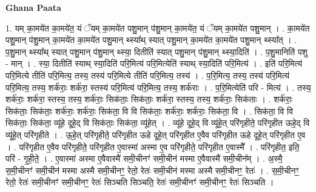 \documentclass[17pt]{extarticle}
\begin{document}
\textbf{Ghana Paata } \newline

1. यम् का॒मये॑त का॒मये॑त॒ यं ॅयम् का॒मये॑त पशु॒मान् प॑शु॒मान् का॒मये॑त॒ यं ॅयम् का॒मये॑त पशु॒मान् । . का॒मये॑त पशु॒मान् प॑शु॒मान् का॒मये॑त का॒मये॑त पशु॒मान् थ्स्या᳚थ् स्यात् पशु॒मान् का॒मये॑त का॒मये॑त पशु॒मान् थ्स्या᳚त् । . प॒शु॒मान् थ्स्या᳚थ् स्यात् पशु॒मान् प॑शु॒मान् थ्स्या॒ दितीति॑ स्यात् पशु॒मान् प॑शु॒मान् थ्स्या॒दिति॑ । . प॒शु॒मानिति॑ पशु - मान् । . स्या॒ दितीति॑ स्याथ् स्या॒दिति॑ परि॒मित्य॑ परि॒मित्येति॑ स्याथ् स्या॒दिति॑ परि॒मित्य॑ । . इति॑ परि॒मित्य॑ परि॒मित्ये तीति॑ परि॒मित्य॒ तस्य॒ तस्य॑ परि॒मित्ये तीति॑ परि॒मित्य॒ तस्य॑ । . प॒रि॒मित्य॒ तस्य॒ तस्य॑ परि॒मित्य॑ परि॒मित्य॒ तस्य॒ शर्क॑राः॒ शर्क॑रा॒ स्तस्य॑ परि॒मित्य॑ परि॒मित्य॒ तस्य॒ शर्क॑राः । . प॒रि॒मित्येति॑ परि - मित्य॑ । . तस्य॒ शर्क॑राः॒ शर्क॑रा॒ स्तस्य॒ तस्य॒ शर्क॑राः॒ सिक॑ताः॒ सिक॑ताः॒ शर्क॑रा॒ स्तस्य॒ तस्य॒ शर्क॑राः॒ सिक॑ताः । . शर्क॑राः॒ सिक॑ताः॒ सिक॑ताः॒ शर्क॑राः॒ शर्क॑राः॒ सिक॑ता॒ वि वि सिक॑ताः॒ शर्क॑राः॒ शर्क॑राः॒ सिक॑ता॒ वि । . सिक॑ता॒ वि वि सिक॑ताः॒ सिक॑ता॒ व्यू॑हे दूहे॒द् वि सिक॑ताः॒ सिक॑ता॒ व्यू॑हेत् । . व्यू॑हे दूहे॒द् वि व्यू॑हे॒त् परि॑गृहीते॒ परि॑गृहीत ऊहे॒द् वि व्यू॑हे॒त् परि॑गृहीते । . ऊ॒हे॒त् परि॑गृहीते॒ परि॑गृहीत ऊहे दूहे॒त् परि॑गृहीत ए॒वैव परि॑गृहीत ऊहे दूहे॒त् परि॑गृहीत ए॒व । . परि॑गृहीत ए॒वैव परि॑गृहीते॒ परि॑गृहीत ए॒वास्मा॑ अस्मा ए॒व परि॑गृहीते॒ परि॑गृहीत ए॒वास्मै᳚ । . परि॑गृहीत॒ इति॒ परि॑ - गृ॒ही॒ते॒ । . ए॒वास्मा॑ अस्मा ए॒वैवास्मै॑ समी॒चीनꣳ॑ समी॒चीन॑ मस्मा ए॒वैवास्मै॑ समी॒चीन᳚म् । . अ॒स्मै॒ स॒मी॒चीनꣳ॑ समी॒चीन॑ मस्मा अस्मै समी॒चीनꣳ॒॒ रेतो॒ रेतः॑ समी॒चीन॑ मस्मा अस्मै समी॒चीनꣳ॒॒ रेतः॑ । . स॒मी॒चीनꣳ॒॒ रेतो॒ रेतः॑ समी॒चीनꣳ॑ समी॒चीनꣳ॒॒ रेतः॑ सिञ्चति सिञ्चति॒ रेतः॑ समी॒चीनꣳ॑ समी॒चीनꣳ॒॒ रेतः॑ सिञ्चति । \newline
\end{document}
